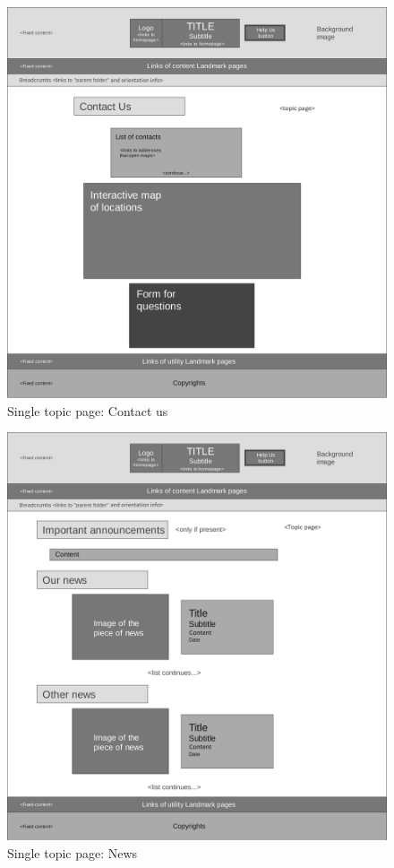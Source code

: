 \begin{figure}[h]
\includegraphics[width=1.3\textwidth, center]{MainMatter/images/5-Single-topic-contact-us}
\caption{Single topic page: Contact us}
\label{fig:figure2}
\end{figure}
%
\begin{figure}[h]
\includegraphics[width=1.3\textwidth, center]{MainMatter/images/6-Single-topic-news}
\caption{Single topic page: News}
\label{fig:figure2}
\end{figure}
